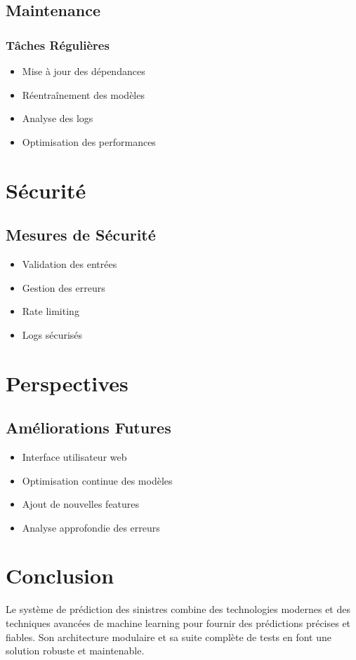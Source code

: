 \documentclass[12pt,a4paper]{report}
\begin{document}
\section{Maintenance}
\subsection{Tâches Régulières}
\begin{itemize}
    \item Mise à jour des dépendances
    \item Réentraînement des modèles
    \item Analyse des logs
    \item Optimisation des performances
\end{itemize}

\chapter{Sécurité}
\section{Mesures de Sécurité}
\begin{itemize}
    \item Validation des entrées
    \item Gestion des erreurs
    \item Rate limiting
    \item Logs sécurisés
\end{itemize}

\chapter{Perspectives}
\section{Améliorations Futures}
\begin{itemize}
    \item Interface utilisateur web
    \item Optimisation continue des modèles
    \item Ajout de nouvelles features
    \item Analyse approfondie des erreurs
\end{itemize}

\chapter{Conclusion}
Le système de prédiction des sinistres combine des technologies modernes et des techniques avancées de machine learning pour fournir des prédictions précises et fiables. Son architecture modulaire et sa suite complète de tests en font une solution robuste et maintenable.
\end{document}

